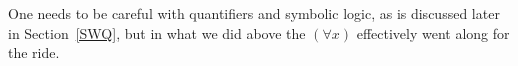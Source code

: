One needs to be careful with quantifiers and symbolic logic, as
is discussed later in Section~\ref{SWQ}, but in what we did above the
$(\forall x)$ effectively went along for the ride.

%
%
%
